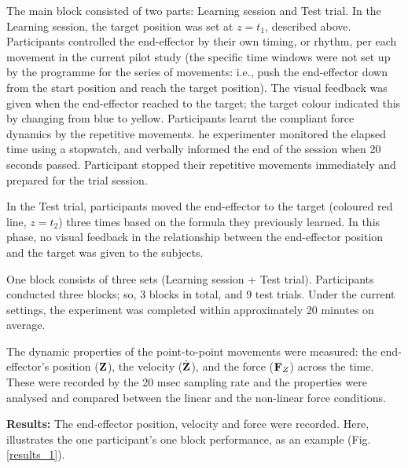 The main block consisted of two parts: Learning session and Test trial. In the Learning session, the target position was set at $z= t_1$, described above. Participants controlled the end-effector by their own timing, or rhythm, per each movement in the current pilot study (the specific time windows were not set up by the programme for the series of movements: i.e., push the end-effector down from the start position and reach the target position). The visual feedback was given when the end-effector reached to the target; the target colour indicated this by changing from blue to yellow. Participants learnt the compliant force dynamics by the repetitive movements. he experimenter monitored the elapsed time using a stopwatch, and verbally informed the end of the session when 20 seconds passed. Participant stopped their repetitive movements immediately and prepared for the trial session. 

In the Test trial, participants moved the end-effector to the target (coloured red line, $z = t_2$) three times based on the formula they previously learned. In this phase, no visual feedback in the relationship between the end-effector position and the target was given to the subjects.

One block consists of three sets (Learning session + Test trial). Participants conducted three blocks; so, 3 blocks in total, and 9 test trials. Under the current settings, the experiment was completed within approximately 20 minutes on average.

The dynamic properties of the point-to-point movements were measured: the end-effector's position ($\mathbf{Z}$), the velocity ($\dot{\mathbf{Z}}$), and the force ($\mathbf{F}_Z$) across the time. These were recorded by the 20 msec sampling rate and the properties were analysed and compared between the linear and the non-linear force conditions.






\textbf{Results:} The end-effector position, velocity and force were recorded. Here, illustrates the one participant's one block performance, as an example (Fig. \ref{results_1}).

